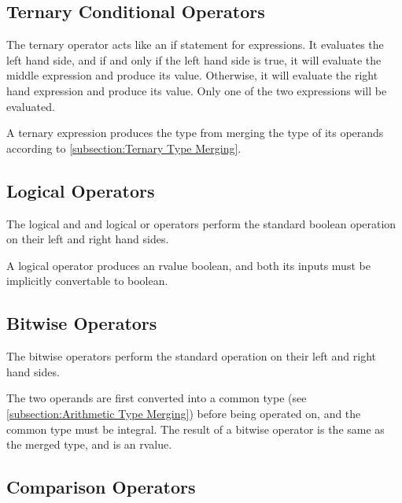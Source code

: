 \documentclass[letterpaper,12pt]{book}
\begin{document}
\subsection{Ternary Conditional Operators}



The ternary operator acts like an if statement for expressions. It evaluates the left hand side, and if and only if the left hand side is true, it will evaluate the middle expression and produce its value. Otherwise, it will evaluate the right hand expression and produce its value. Only one of the two expressions will be evaluated.

A ternary expression produces the type from merging the type of its operands according to \ref{subsection:Ternary Type Merging}.

\subsection{Logical Operators}



The logical and and logical or operators perform the standard boolean operation on their left and right hand sides.

A logical operator produces an rvalue boolean, and both its inputs must be implicitly convertable to boolean.

\subsection{Bitwise Operators}



The bitwise operators perform the standard operation on their left and right hand sides.

The two operands are first converted into a common type (see \ref{subsection:Arithmetic Type Merging}) before being operated on, and the common type must be integral. The result of a bitwise operator is the same as the merged type, and is an rvalue.

\subsection{Comparison Operators}
\end{document}
